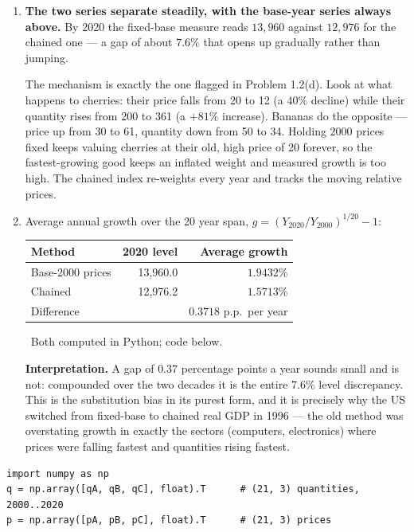 \documentclass[12pt, letterpaper]{article}
\begin{document}
\begin{tcolorbox}[oddbox,title={Problem 1.3 \quad Chained GDP}]
\begin{enumerate}
\item \textbf{The two series separate steadily, with the base-year series always above.}
By 2020 the fixed-base measure reads $13{,}960$ against $12{,}976$ for the chained one --- a
gap of about $7.6\%$ that opens up gradually rather than jumping.

The mechanism is exactly the one flagged in Problem 1.2(d). Look at what happens to
cherries: their price falls from 20 to 12 (a $40\%$ decline) while their quantity rises from
200 to 361 (a $+81\%$ increase). Bananas do the opposite --- price up from 30 to 61,
quantity down from 50 to 34. Holding 2000 prices fixed keeps valuing cherries at their old,
high price of 20 forever, so the fastest-growing good keeps an inflated weight and measured
growth is too high. The chained index re-weights every year and tracks the moving relative
prices.

\item Average annual growth over the 20 year span, $g = (Y_{2020}/Y_{2000})^{1/20} - 1$:

\begin{center}
\begin{tabular}{lrr}
\toprule
\textbf{Method} & \textbf{2020 level} & \textbf{Average growth} \\
\midrule
Base-2000 prices & 13,960.0 & $\mathbf{1.9432\%}$ \\
Chained          & 12,976.2 & $\mathbf{1.5713\%}$ \\
\midrule
Difference       &          & $0.3718$ p.p.\ per year \\
\bottomrule
\end{tabular}
\end{center}
\checkmark\ Both computed in Python; code below.

\textbf{Interpretation.} A gap of $0.37$ percentage points a year sounds small and is not:
compounded over the two decades it is the entire $7.6\%$ level discrepancy. This is the
substitution bias in its purest form, and it is precisely why the US switched from
fixed-base to chained real GDP in 1996 --- the old method was overstating growth in exactly
the sectors (computers, electronics) where prices were falling fastest and quantities rising
fastest.
\end{enumerate}

\begin{tcolorbox}[theorybox,title={Verification code (executed)}]
\footnotesize
\begin{verbatim}
import numpy as np
q = np.array([qA, qB, qC], float).T      # (21, 3) quantities, 2000..2020
p = np.array([pA, pB, pC], float).T      # (21, 3) prices


\end{verbatim}
\end{tcolorbox}
\end{tcolorbox}
\end{document}
